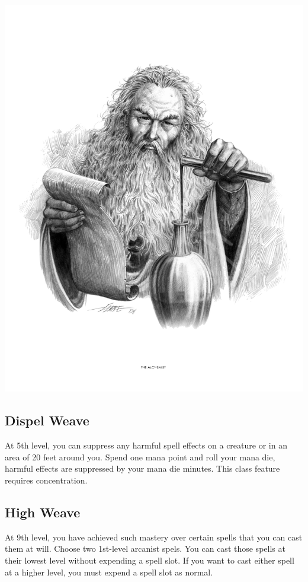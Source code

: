 \begin{multicols*}{2}
\begin{Figure}
\centering
\includegraphics[width=\textwidth]{img/wizard.png}
\end{Figure}

\subsection*{Dispel Weave}

At 5th level, you can suppress any harmful spell effects on a creature or in an area of 20 feet around you. Spend one mana point and roll your mana die, harmful effects are suppressed by your mana die minutes. This class feature requires concentration.

\subsection*{High Weave}

At 9th level, you have achieved such mastery over certain spells that you can cast them at will. Choose two 1st-level arcanist spels. You can cast those spells at their lowest level without expending a spell slot. If you want to cast either spell at a higher level, you must expend a spell slot as normal.


\end{multicols*}
